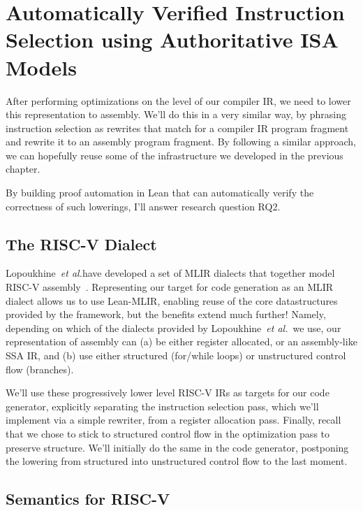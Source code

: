 \documentclass[a4paper]{scrartcl}
\newcommand*{\etal}{~\emph{et al.}}
\begin{document}
\section{Automatically Verified Instruction Selection using
Authoritative ISA Models}\label{scaling-high-assurance-translation-validation-to-authoritative-isa-models}

After performing optimizations on the level of our compiler IR, we need
to lower this representation to assembly. We'll do this in a very
similar way, by phrasing instruction selection as rewrites that match
for a compiler IR program fragment and rewrite it to an assembly program
fragment. By following a similar approach, we can hopefully reuse some
of the infrastructure we developed in the previous chapter.

By building proof automation in Lean that can automatically verify the correctness of
such lowerings, I'll answer research question \textsc{RQ2}.

\subsection{The RISC-V Dialect}\label{the-risc-v-dialect}

Lopoukhine\etal{}have developed a set of MLIR
dialects that together model RISC-V assembly~\cite{lopoukhineMultiLevelCompilerBackend}. Representing our target
for code generation as an MLIR dialect allows us to use Lean-MLIR,
enabling reuse of the core datastructures provided by the framework, but
the benefits extend much further! Namely, depending on which of the
dialects provided by Lopoukhine\etal{}~we use, our representation of
assembly can (a) be either register allocated, or an assembly-like
SSA IR, and (b) use either structured (for/while loops) or unstructured
control flow (branches).

We'll use these progressively lower level RISC-V IRs as targets for our code
generator, explicitly separating the instruction selection pass, which
we'll implement via a simple rewriter, from a register allocation pass.
Finally, recall that we chose to stick to structured control flow in the
optimization pass to preserve structure. We'll initially do the same in the code
generator, postponing the lowering from structured into unstructured
control flow to the last moment. 

\subsection{Semantics for RISC-V}
\end{document}
